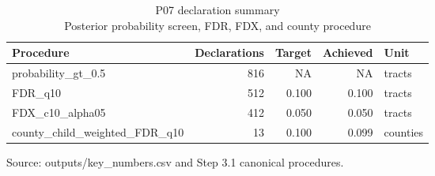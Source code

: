 \begin{table}[t]
\caption*{
{\fontsize{20}{25}\selectfont  P07 declaration summary\fontsize{12}{15}\selectfont } \\ 
{\fontsize{14}{17}\selectfont  Posterior probability screen, FDR, FDX, and county procedure\fontsize{12}{15}\selectfont }
} 
\fontsize{12.0pt}{14.0pt}\selectfont
\begin{tabular*}{\linewidth}{@{\extracolsep{\fill}}lrrrl}
\toprule
Procedure & Declarations & Target & Achieved & Unit \\ 
\midrule\addlinespace[2.5pt]
probability\_gt\_0.5 & 816 & NA & NA & tracts \\ 
FDR\_q10 & 512 & 0.100 & 0.100 & tracts \\ 
FDX\_c10\_alpha05 & 412 & 0.050 & 0.050 & tracts \\ 
county\_child\_weighted\_FDR\_q10 & 13 & 0.100 & 0.099 & counties \\ 
\bottomrule
\end{tabular*}
\begin{minipage}{\linewidth}
\vspace{.05em}
Source: outputs/key\_numbers.csv and Step 3.1 canonical procedures.\\
\end{minipage}
\end{table}

